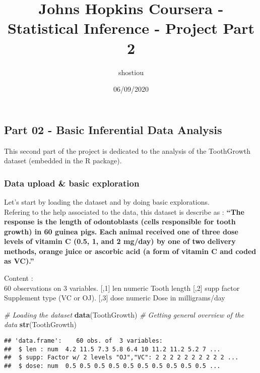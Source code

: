 \documentclass[
]{article}
\title{Johns Hopkins Coursera - Statistical Inference - Project Part 2}
\author{shostiou}
\date{06/09/2020}
\newenvironment{Shaded}{\begin{snugshade}}{\end{snugshade}}
\newcommand{\CommentTok}[1]{\textcolor[rgb]{0.56,0.35,0.01}{\textit{#1}}}
\newcommand{\KeywordTok}[1]{\textcolor[rgb]{0.13,0.29,0.53}{\textbf{#1}}}
\newcommand{\NormalTok}[1]{#1}
\begin{document}
\maketitle

\hypertarget{part-02---basic-inferential-data-analysis}{%
\subsection{Part 02 - Basic Inferential Data
Analysis}\label{part-02---basic-inferential-data-analysis}}

This second part of the project is dedicated to the analysis of the
ToothGrowth dataset (embedded in the R package).

\hypertarget{data-upload-basic-exploration}{%
\subsubsection{Data upload \& basic
exploration}\label{data-upload-basic-exploration}}

Let's start by loading the dataset and by doing basic explorations.\\
Refering to the help associated to the data, this dataset is describe as
: \textbf{``The response is the length of odontoblasts (cells
responsible for tooth growth) in 60 guinea pigs. Each animal received
one of three dose levels of vitamin C (0.5, 1, and 2 mg/day) by one of
two delivery methods, orange juice or ascorbic acid (a form of vitamin C
and coded as VC).''}

Content :\\
60 observations on 3 variables. {[},1{]} len numeric Tooth length
{[},2{]} supp factor Supplement type (VC or OJ). {[},3{]} dose numeric
Dose in milligrams/day

\begin{Shaded}
\begin{Highlighting}[]
\CommentTok{# Loading the dataset}
\KeywordTok{data}\NormalTok{(ToothGrowth)  }
\CommentTok{# Getting general overview of the data  }
\KeywordTok{str}\NormalTok{(ToothGrowth)  }
\end{Highlighting}
\end{Shaded}

\begin{verbatim}
## 'data.frame':    60 obs. of  3 variables:
##  $ len : num  4.2 11.5 7.3 5.8 6.4 10 11.2 11.2 5.2 7 ...
##  $ supp: Factor w/ 2 levels "OJ","VC": 2 2 2 2 2 2 2 2 2 2 ...
##  $ dose: num  0.5 0.5 0.5 0.5 0.5 0.5 0.5 0.5 0.5 0.5 ...
\end{verbatim}
\end{document}
